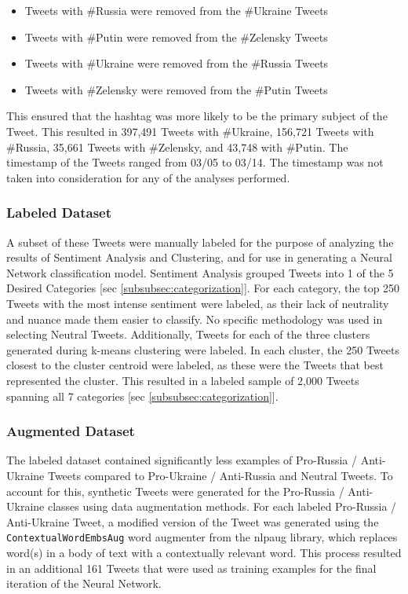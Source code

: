 \documentclass[12pt,letterpaper,oneside,titlepage]{article}
\begin{document}
\begin{itemize}
    \item Tweets with \#Russia were removed from the \#Ukraine Tweets
    \item Tweets with \#Putin were removed from the \#Zelensky Tweets
    \item Tweets with \#Ukraine were removed from the \#Russia Tweets
    \item Tweets with \#Zelensky were removed from the \#Putin Tweets
\end{itemize}

This ensured that the hashtag was more likely to be the primary subject of the Tweet. This resulted in 397,491 Tweets with \#Ukraine, 156,721 Tweets with \#Russia, 35,661 Tweets with \#Zelensky, and 43,748
with \#Putin. The timestamp of the Tweets ranged from 03/05 to 03/14. The timestamp was not taken into consideration
for any of the analyses performed.

\subsubsection{Labeled Dataset}\label{subsubsec:labeled-dataset}

A subset of these Tweets were manually labeled for the purpose of analyzing the results of Sentiment Analysis and 
Clustering, and for use in generating a Neural Network classification model.
Sentiment Analysis grouped Tweets into 1 of the 5 Desired Categories [sec \ref{subsubsec:categorization}].
For each category, the top 250 Tweets with the most intense sentiment were labeled, as their lack of neutrality and 
nuance made them easier to classify.  No specific methodology was used in selecting Neutral Tweets. 
Additionally, Tweets for each of the three clusters generated during k-means clustering were 
labeled. In each cluster, the 250 Tweets closest to the cluster centroid were labeled, as these were the Tweets that 
best represented the cluster. This resulted in a labeled sample of 2,000 Tweets spanning all 7 categories [sec \ref{subsubsec:categorization}].

\subsubsection{Augmented Dataset}\label{subsubsec:augmented-dataset}

The labeled dataset contained significantly less examples of Pro-Russia / Anti-Ukraine Tweets compared to 
Pro-Ukraine / Anti-Russia and Neutral Tweets. 
To account for this, synthetic Tweets were generated for the Pro-Russia / Anti-Ukraine classes using data augmentation 
methods. 
For each labeled Pro-Russia / Anti-Ukraine Tweet, a modified version of the Tweet was generated using the
\lstinline{ContextualWordEmbsAug}\lstinline{} word augmenter from the nlpaug library, which replaces word(s) in a body of text with a contextually relevant word\cite{ma2019nlpaug}. 
This process resulted in an additional 161 Tweets that were used as training examples for the final iteration of the 
Neural Network.
\end{document}
